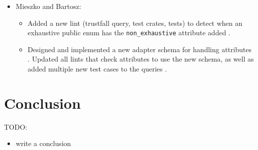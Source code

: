 \documentclass[licencjacka,en]{pracamgr}
\begin{document}
\begin{itemize}
\begin{itemize}

\end{itemize}

	\item Mieszko and Bartosz:
		\begin{itemize}
			\item Added a new lint (trustfall query, test crates, tests) to detect when an exhaustive
				public enum has the \texttt{non\_exhaustive} attribute added \cite{pr_lint_enum_non_exhaustive}.

			\item Designed and implemented a new adapter schema for handling attributes
				\cite{pr_adapter_new_schema_for_attributes}.
				Updated all lints that check attributes to use the new schema, as well as added multiple
				new test cases to the queries \cite{pr_new_schema_for_attributes}.
		\end{itemize}
\end{itemize}


\chapter{Conclusion}\label{r:chapter_conclusion}

TODO:
\begin{itemize}
	\item write a conclusion
\end{itemize}



\appendix
\end{document}
